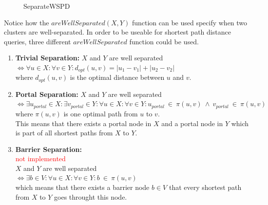 \documentclass{article}
\begin{document}
\begin{figure}[ht!]
  \begin{algorithm}[H]

    \caption{SeparateWSPD}
    \label{alg:SeparateWSPD}
  \end{algorithm}
\end{figure}

Notice how the $areWellSeparated(X, Y)$ function can be used specify when two clusters are well-separated.
In order to be useable for shortest path distance queries, three different $areWellSeparated$ function could be used.

\begin{enumerate}
\item \textbf{Trivial Separation:} $X$ and $Y$ are well separated \\
  $\iff \forall u \in X: \forall v \in Y: d_{opt}(u, v) = |u_1 - v_1| + |u_2 - v_2|$\\
  where $d_{opt}(u, v)$ is the optimal distance between $u$ and $v$.
\item \textbf{Portal Separation:} $X$ and $Y$ are well separated \\
  $\iff \exists u_{portal} \in X: \exists v_{portal} \in Y: \forall u \in X: \forall v \in Y: u_{portal}~\in~\pi(u, v)~\land~v_{portal}~\in~\pi(u, v)$\\
  where $\pi(u, v)$ is one optimal path from $u$ to $v$.\\
  This means that there exists a portal node in $X$ and a portal node in $Y$ which is part of all shortest paths from $X$ to $Y$.

\item \textbf{Barrier Separation:}\\
  \textcolor{red}{not implemented\\}
  $X$ and $Y$ are well separated \\
  $\iff \exists b \in V: \forall u \in X: \forall v \in Y: b~\in~\pi(u, v)$\\
  which means that there exists a barrier node $b \in V$ that every shortest path from $X$ to $Y$ goes throught this node.

\end{enumerate}
\end{document}
